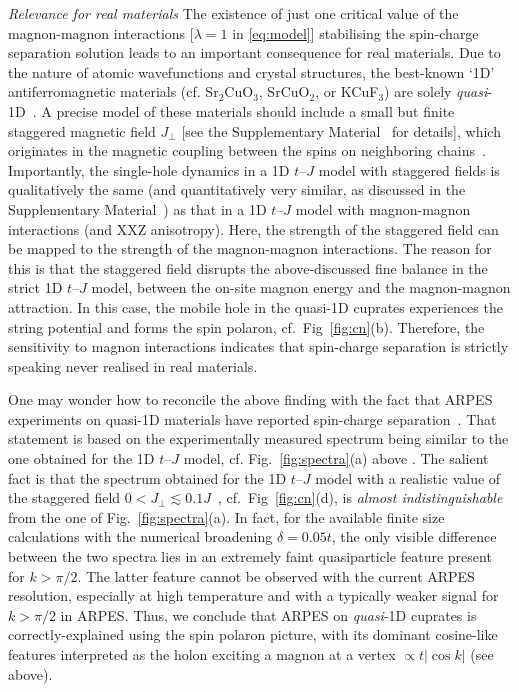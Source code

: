 \documentclass[%
 reprint,
 amsmath,amssymb,
 aps,
prl,
]{revtex4-1}
\begin{document}
{\it Relevance for real materials} The existence of just one critical value of the magnon-magnon interactions [$\lambda =1$ in \eqref{eq:model}] stabilising the spin-charge separation solution leads to an important consequence for real materials. Due to the nature of atomic wavefunctions and crystal structures, the best-known `1D'
antiferromagnetic materials (cf. Sr$_2$CuO$_3$, SrCuO$_2$, or KCuF$_3$) are solely {\it quasi}-1D~\cite{Kojima1997, Matsuda1997, Lake2005}. A precise model of these materials should include a small but finite staggered magnetic field $J_\perp$ [see the Supplementary Material~\cite{SM} for details], which originates in the magnetic coupling between the spins on neighboring chains~\cite{Schulz1996, Essler1997, Sandvik1999}.
Importantly, the single-hole dynamics in a 1D $t$--$J$ model with staggered fields is qualitatively the same (and quantitatively very similar, as discussed in the Supplementary Material~\cite{SM}) as
that in a 1D $t$--$J$ model with magnon-magnon interactions (and XXZ anisotropy). Here, the strength of the staggered field can be mapped to the strength of the magnon-magnon interactions.
The reason for this is that the staggered field disrupts the above-discussed fine balance in the strict 1D $t$--$J$ model, between the on-site magnon energy and the magnon-magnon attraction. 
In this case, the mobile hole in the quasi-1D cuprates experiences the string potential and forms 
the spin polaron, cf.~Fig~\ref{fig:cn}(b). Therefore, the sensitivity to magnon interactions indicates that spin-charge separation is strictly speaking never realised in real materials.

One may wonder how to reconcile the above finding with the fact that ARPES experiments on quasi-1D materials have reported 
spin-charge separation~\cite{Kim96, Kim1997, Fujisawa1999, Koitzsch2006, Kim06}. That statement is based on the experimentally measured spectrum being similar 
to the one obtained for the 1D $t$--$J$ model, 
cf. Fig.~\ref{fig:spectra}(a) above \cite{Kim96, Kim1997, Fujisawa1999, Koitzsch2006, Kim06}. The salient fact is that the spectrum obtained for the 1D $t$--$J$
model with a realistic value of the staggered field $0<J_\perp \lesssim 0.1J$~\cite{SM}, cf.~Fig~\ref{fig:cn}(d), is {\it almost indistinguishable}
from the one of Fig.~\ref{fig:spectra}(a). 
In fact, for the available finite size calculations with the numerical broadening $\delta = 0.05 t$, 
the only visible difference between the two spectra lies in an extremely faint quasiparticle feature present for $k>\pi/2$. The latter
feature cannot be observed with the current ARPES resolution, especially at high temperature and with a typically
weaker signal for $k>\pi/2$ in ARPES. Thus, we conclude that ARPES on {\it quasi}-1D
cuprates is correctly-explained using the spin polaron picture, with its dominant cosine-like features interpreted
as the holon exciting a magnon at a vertex $\propto t |\cos k|$ (see above).
\end{document}
